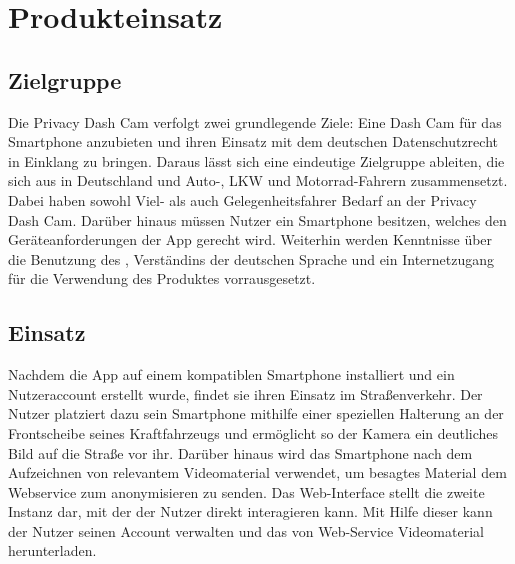 \chapter{Produkteinsatz}

\section{Zielgruppe}
Die Privacy Dash Cam verfolgt zwei grundlegende Ziele: Eine Dash Cam für das \gls{Smartphone} anzubieten und ihren Einsatz mit dem deutschen Datenschutzrecht in Einklang zu bringen. Daraus lässt sich eine eindeutige Zielgruppe ableiten, die sich aus in Deutschland und Auto-, LKW und Motorrad-Fahrern zusammensetzt. Dabei haben sowohl Viel- als auch Gelegenheitsfahrer Bedarf an der Privacy Dash Cam. Darüber hinaus müssen Nutzer ein \gls{Smartphone} besitzen, welches den Geräteanforderungen der \gls{App} gerecht wird. Weiterhin werden Kenntnisse über die Benutzung des , Verständins der deutschen Sprache und ein Internetzugang für die Verwendung des Produktes vorrausgesetzt.

\section{Einsatz}
Nachdem die \gls{App} auf einem kompatiblen \gls{Smartphone} installiert und ein Nutzeraccount erstellt wurde, findet sie ihren Einsatz im Straßenverkehr. Der Nutzer platziert dazu sein \gls{Smartphone} mithilfe einer speziellen Halterung an der Frontscheibe seines Kraftfahrzeugs und ermöglicht so der Kamera ein deutliches Bild auf die Straße vor ihr. Darüber hinaus wird das \gls{Smartphone} nach dem Aufzeichnen von relevantem Videomaterial verwendet, um besagtes Material dem Webservice zum \gls{anonymisieren} zu senden.\newline
Das Web-Interface stellt die zweite Instanz dar, mit der der Nutzer direkt interagieren kann. Mit Hilfe dieser kann der Nutzer seinen Account verwalten und das von Web-Service  Videomaterial herunterladen.


